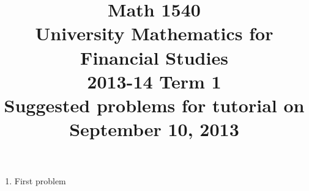 \documentclass[8pt]{article} %
\title{Math 1540\\University Mathematics for Financial Studies\\2013-14 Term 1\\Suggested problems for tutorial on\\September 10, 2013}
\begin{document}
\maketitle
\begin{enumerate}
	\item{First problem}
\end{enumerate}
\end{document}
